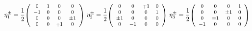 \begin{equation}
\eta _{1}^{\pm}={1\over 2} \texttt{\footnotesize 
$\left( \begin{array}{cccc} 0 & 1 & 0 & 0
\\ -1 & 0 & 0 & 0 \\ 0 & 0 & 0 & \pm 1 \\ 0 & 0 & \mp 1 & 0 \end{array}
\right)$} \,\, 
\eta_{2}^{\pm}={1\over 2}  \texttt{\footnotesize $
\left( \begin{array}{cccc} 0 & 0 & \mp 1 & 0 \\ 0 & 0 & 0 & 1 \\
\pm 1 & 0 & 0 & 0 \\ 0 & -1 & 0 & 0
\end{array} \right) $}\,\,
\eta _{3}^{\pm}={1\over 2}  \texttt{\footnotesize $\left(\begin{array}{cccc} 0 & 0 & 0 & 1 \\
0 & 0 & \pm 1 & 0 \\ 0 & \mp 1 & 0 & 0 \\ -1 & 0 & 0 & 0 \end{array}
\right)$}
\label{eta}
\end{equation}

